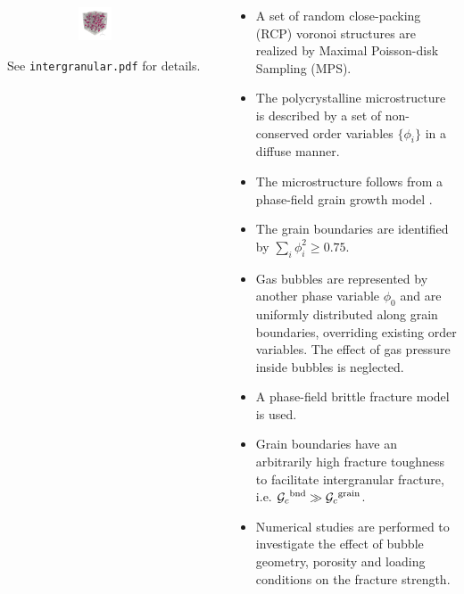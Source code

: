 \begin{frame}{}
\begin{columns}
\begin{column}{0.3\textwidth}
\begin{figure}[htb!]
            \begin{subfigure}{\textwidth}
                \centering
                \includegraphics[width=0.5\textwidth]{past/figures/b150_ini_new.png}
            \end{subfigure}
        \end{figure}
        \vspace{-2em}
        \begin{exampleblock}{}
            See \texttt{intergranular.pdf} for details.
        \end{exampleblock}
    \end{column}
    \begin{column}{0.7\textwidth}
        \begin{itemize}
            \item A set of random close-packing (RCP) voronoi structures are realized by Maximal Poisson-disk Sampling (MPS).
            \item The polycrystalline microstructure is described by a set of non-conserved order variables $\{\phi_i\}$ in a diffuse manner.
            \item The microstructure follows from a phase-field grain growth model \cite{Moelans2008}.
            \item The grain boundaries are identified by $\sum_i \phi_i^2 \geqslant 0.75$.
            \item Gas bubbles are represented by another phase variable $\phi_0$ and are uniformly distributed along grain boundaries, overriding existing order variables. The effect of gas pressure inside bubbles is neglected.
            \pause
            \item A phase-field brittle fracture model is used.
            \item Grain boundaries have an arbitrarily high fracture toughness to facilitate intergranular fracture, i.e. ${\mathcal{G}_c}^\text{bnd} \gg {\mathcal{G}_c}^\text{grain}$.
            \pause
            \item \textcolor<4>{dukeroyal}{Numerical studies are performed to investigate the effect of bubble geometry, porosity and loading conditions on the fracture strength.}
        \end{itemize}
    \end{column}
\end{columns}
\end{frame}

